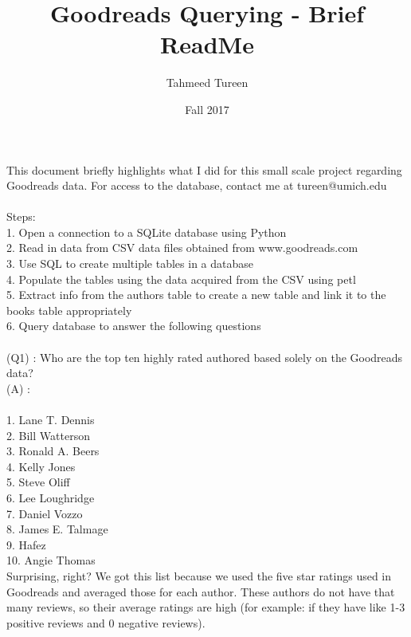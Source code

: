 \documentclass[11pt]{article}
\begin{document}
\title{Goodreads Querying - Brief ReadMe}
\author{Tahmeed Tureen}
\date{Fall 2017}
\maketitle

This document briefly highlights what I did for this small scale project regarding Goodreads data. For access to the database, contact me at tureen@umich.edu \\~\\



Steps:\\
1. Open a connection to a SQLite database using Python\\
2. Read in data from CSV data files obtained from www.goodreads.com\\
3. Use SQL to create multiple tables in a database\\
4. Populate the tables using the data acquired from the CSV using petl\\
5. Extract info from the authors table to create a new table and link it to the books table appropriately\\
6. Query database to answer the following questions\\~\\


(Q1) : Who are the top ten highly rated authored based solely on the Goodreads data?\\

(A) :\\~\\
1. Lane T. Dennis\\
2. Bill Watterson\\
3. Ronald A. Beers\\
4. Kelly Jones\\
5. Steve Oliff\\
6. Lee Loughridge\\
7. Daniel Vozzo\\
8. James E. Talmage\\
9. Hafez\\
10. Angie Thomas\\

Surprising, right? We got this list because we used the five star ratings used in Goodreads and averaged those for each author. These authors do not have that many reviews, so their average ratings are high (for example: if they have like 1-3 positive reviews and 0 negative reviews).\\~\\
\end{document}
